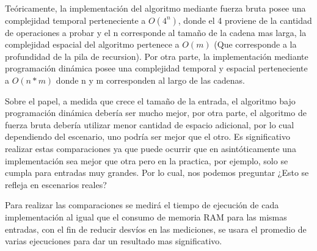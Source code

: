 Teóricamente, la implementación del algoritmo mediante fuerza bruta 
posee una complejidad temporal perteneciente a \( O(4^n) \), donde el 4 proviene
de la cantidad de operaciones a probar y el n corresponde al tamaño de la cadena mas larga, la complejidad
espacial del algoritmo pertenece a \( O(m) \) (Que corresponde a la profundidad de la pila
de recursion). Por otra parte, la implementación mediante programación dinámica
posee una complejidad temporal y espacial perteneciente a \( O(n*m) \) donde n y m corresponden
al largo de las cadenas.

Sobre el papel, a medida que crece el tamaño de la entrada, el algoritmo bajo programación
dinámica debería ser mucho mejor, por otra parte, el algoritmo de fuerza bruta debería
utilizar menor cantidad de espacio adicional, por lo cual dependiendo del escenario, uno
podría ser mejor que el otro. Es significativo 
realizar estas comparaciones ya que puede ocurrir 
que en asintóticamente una implementación sea mejor que otra
pero en la practica, por ejemplo, solo se cumpla para entradas muy grandes.
Por lo cual, nos podemos preguntar ¿Esto se refleja en escenarios reales?


Para realizar las comparaciones
se medirá el tiempo de ejecución de cada implementación
al igual que el consumo de memoria RAM para las mismas entradas, con 
el fin de reducir desvíos en las mediciones, se usara el promedio
de varias ejecuciones para dar un resultado mas significativo.
